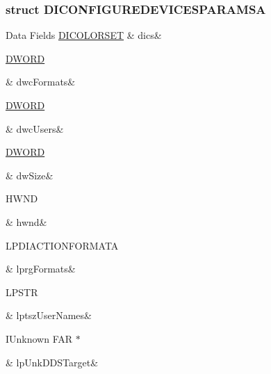 \subsubsection{struct D\-I\-C\-O\-N\-F\-I\-G\-U\-R\-E\-D\-E\-V\-I\-C\-E\-S\-P\-A\-R\-A\-M\-S\-A}
\begin{DoxyFields}{Data Fields}
\hypertarget{a00003_a1877b79618926362653fbfec34a6321a}{\hyperlink{a00003_d3/d8b/a00059}{D\-I\-C\-O\-L\-O\-R\-S\-E\-T}}\label{a00003_a1877b79618926362653fbfec34a6321a}
&
dics&
\\
\hline

\hypertarget{a00003_ae3a71581f53b592af8910ac6a9f867f7}{\hyperlink{a00003_a50e15ae51c87ae06ab29c8148cb5f36c}{D\-W\-O\-R\-D}}\label{a00003_ae3a71581f53b592af8910ac6a9f867f7}
&
dwc\-Formats&
\\
\hline

\hypertarget{a00003_ade21eb3ea47100f8f2a53b9c9ed0a16e}{\hyperlink{a00003_a50e15ae51c87ae06ab29c8148cb5f36c}{D\-W\-O\-R\-D}}\label{a00003_ade21eb3ea47100f8f2a53b9c9ed0a16e}
&
dwc\-Users&
\\
\hline

\hypertarget{a00003_a669c5a85f5a9eb97e64ad880fadaaa2d}{\hyperlink{a00003_a50e15ae51c87ae06ab29c8148cb5f36c}{D\-W\-O\-R\-D}}\label{a00003_a669c5a85f5a9eb97e64ad880fadaaa2d}
&
dw\-Size&
\\
\hline

\hypertarget{a00003_aa72255e7356d612ad72bb45def01fcbb}{H\-W\-N\-D}\label{a00003_aa72255e7356d612ad72bb45def01fcbb}
&
hwnd&
\\
\hline

\hypertarget{a00003_aeb3b267793b1d83f32acadc86026e9fe}{L\-P\-D\-I\-A\-C\-T\-I\-O\-N\-F\-O\-R\-M\-A\-T\-A}\label{a00003_aeb3b267793b1d83f32acadc86026e9fe}
&
lprg\-Formats&
\\
\hline

\hypertarget{a00003_ac374823972ef0a5a9802c975f4df2dc4}{L\-P\-S\-T\-R}\label{a00003_ac374823972ef0a5a9802c975f4df2dc4}
&
lptsz\-User\-Names&
\\
\hline

\hypertarget{a00003_a6e6e41b251e9d9f1871531c9d8c07e09}{I\-Unknown F\-A\-R $\ast$}\label{a00003_a6e6e41b251e9d9f1871531c9d8c07e09}
&
lp\-Unk\-D\-D\-S\-Target&
\\
\hline

\end{DoxyFields}
\label{df/d03/a00062}
\hypertarget{a00003_df/d03/a00062}{}
